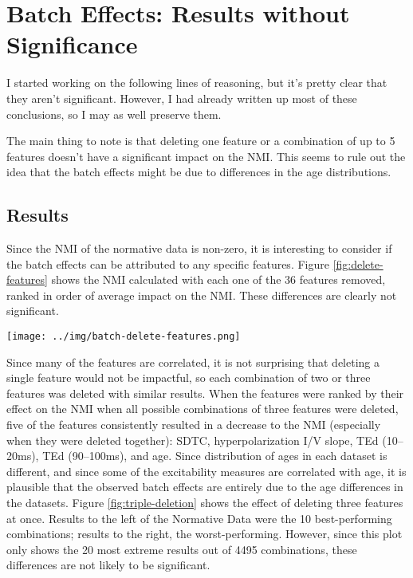 \documentclass[12pt]{article}
\begin{document}
\section*{Batch Effects: Results without Significance}

I started working on the following lines of reasoning, but it's pretty clear that they aren't significant. However, I had already written up most of these conclusions, so I may as well preserve them.

The main thing to note is that deleting one feature or a combination of up to 5 features doesn't have a significant impact on the NMI. This seems to rule out the idea that the batch effects might be due to differences in the age distributions.

\subsection*{Results}

Since the NMI of the normative data is non-zero, it is interesting to consider if the batch effects can be attributed to any specific features. Figure \ref{fig:delete-features} shows the NMI calculated with each one of the 36 features removed, ranked in order of average impact on the NMI. These differences are clearly not significant.

\begin{figure*}[ht]
  \centering
       \texttt{[image: ../img/batch-delete-features.png]}
         \caption{}
  \label{fig:delete-features}
\end{figure*}


Since many of the features are correlated, it is not surprising that deleting a single feature would not be impactful, so each combination of two or three features was deleted with similar results. When the features were ranked by their effect on the NMI when all possible combinations of three features were deleted, five of the features consistently resulted in a decrease to the NMI (especially when they were deleted together): SDTC, hyperpolarization I/V slope, TEd (10–20ms), TEd (90–100ms), and age. Since distribution of ages in each dataset is different, and since some of the excitability measures are correlated with age, %
it is plausible that the observed batch effects are entirely due to the age differences in the datasets. Figure \ref{fig:triple-deletion} shows the effect of deleting three features at once. Results to the left of the Normative Data were the 10 best-performing combinations; results to the right, the worst-performing. However, since this plot only shows the 20 most extreme results out of 4495 combinations, these differences are not likely to be significant.
\end{document}
